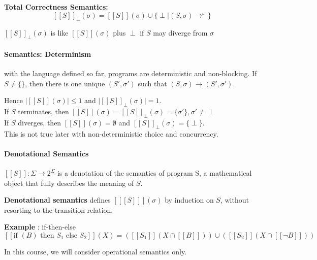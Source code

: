 \documentclass[12pt, a4paper]{book}
\begin{document}
\textbf{Total Correctness Semantics:}
$$
{[[S]]}_{\perp}(\sigma) = [[S]](\sigma) \cup \{\perp \mid (S,\sigma) \longrightarrow^{\omega}\}
$$

${[[S]]}_{\perp}(\sigma)$ is like $[[S]](\sigma)$ plus $\perp$ if $S$ may
diverge from $\sigma$

\paragraph{Semantics: Determinism}

with the language defined so far, programs are deterministic and non-blocking.
If $S \neq \{ \}$, then there is one unique $(S',\sigma')$ such that
$(S,\sigma) \longrightarrow (S', \sigma')$. \newline

Hence $\lvert [[S]](\sigma) \rvert \le 1$ and $\lvert {[[S]]}_{\perp}(\sigma) \rvert = 1$. \\
If $S$ terminates, then $[[S]](\sigma) = {[[S]]}_{\perp}(\sigma) = \{\sigma'\}, \sigma' \neq \perp$ \\
If $S$ diverges, then $[[S]](\sigma) = \emptyset$ and ${[[S]]}_{\perp}(\sigma) = \{\perp\}$. \\
This is not true later with non-deterministic choice and concurrency.

\paragraph{Denotational Semantics}

$[[S]] : \Sigma \rightarrow 2^{\Sigma}$ is a denotation of the semantics of
program S, a mathematical object that fully describes the meaning of $S$.

\textbf{Denotational semantics} defines $[[[S]]](\sigma)$ by induction on $S$,
without resorting to the transition relation.

\begin{framed}
    \textbf{Example} : if-then-else
    $$
    [[\textrm{if } (B) \textrm{ then } S_{1} \textrm{ else } S_{2}]](X) =
    ([[S_{1}]] (X \cap [[B]])) \cup ([[S_{2}]] ( X \cap [[\lnot B]] ))
    $$
\end{framed}

In this course, we will consider operational semantics only.


\end{document}
